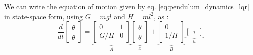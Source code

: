 We can write the equation of motion given by eq. \eqref{eq:pendulum_dynamics_lqr} in state-space form, using $G=mgl$ and $H=ml^2$, as :
\begin{equation}
\frac{d}{dt} 
\begin{bmatrix}
    \theta \\
    \dot{\theta} 
\end{bmatrix}
= 
\underbrace{
\begin{bmatrix}
    0 & 1 \\
    G/H & 0 
\end{bmatrix}
}_{A}
\underbrace{
\begin{bmatrix}
    \theta \\
    \dot{\theta} 
\end{bmatrix}
}_{x}
+
\underbrace{
\begin{bmatrix}
    0 \\
    1/H
\end{bmatrix}
}_{B}
\underbrace{
\begin{bmatrix}
    \tau
\end{bmatrix}
}_{u}
\end{equation}

